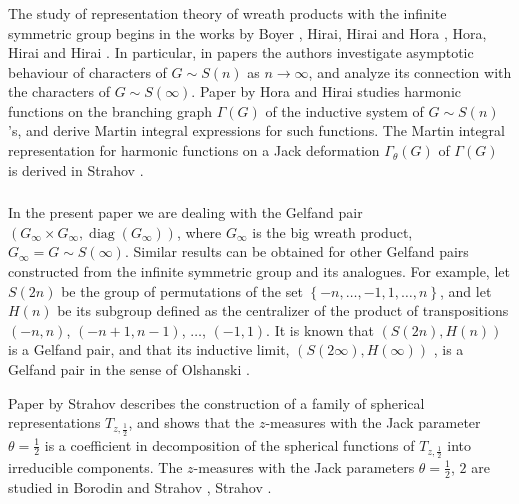 \documentclass[12pt]{amsart}
\theoremstyle{definition}
\numberwithin{equation}{section}
\DeclareMathOperator{\diag}{diag}
\begin{document}
\subsubsection{}
The study of representation theory of wreath products with the infinite symmetric group begins in the works by Boyer \cite{Boyer}, Hirai,  Hirai and Hora \cite{HiraiHiraiHoraI},  Hora, Hirai and Hirai \cite{HoraHiraiHiraiII}.
In particular, in papers \cite{HiraiHiraiHoraI,HoraHiraiHiraiII}
the authors investigate asymptotic behaviour of characters of $G\sim S(n)$ as $n\rightarrow\infty$, and analyze its connection with the characters of $G\sim S(\infty)$. Paper by Hora and Hirai \cite{HoraHirai} studies harmonic functions on the branching graph $\Gamma\left(G\right)$ of the inductive system of $G\sim S(n)$'s, and derive Martin integral expressions for such functions. The Martin integral representation for harmonic functions on a Jack deformation $\Gamma_{\theta}\left(G\right)$ of $\Gamma\left(G\right)$ is derived in Strahov \cite{StrahovMPS}.

\subsubsection{} In the present paper we are dealing with the Gelfand pair
$\left(G_{\infty}\times G_{\infty},\diag\left(G_{\infty}\right)\right)$,
where $G_{\infty}$ is the big wreath product, $G_{\infty}=G\sim S(\infty)$.
Similar results can be obtained for other Gelfand pairs
constructed from the infinite symmetric group and its analogues.
For example, let $S(2n)$ be  the group of permutations of the set $\left\{-n,\ldots,-1,1,\ldots,n\right\}$, and let $H(n)$ be its subgroup defined as the centralizer of the product of transpositions $(-n,n)$, $(-n+1,n-1)$,
 $\ldots$, $(-1,1)$. It is known that $\left(S(2n),H(n)\right)$ is a Gelfand pair,
and that its inductive limit, $\left(S(2\infty), H(\infty)\right)$ , is a Gelfand pair in the sense of Olshanski \cite{Olshanski}.


Paper by Strahov \cite{StrahovSH}
 describes the construction of a family of spherical representations
 $T_{z,\frac{1}{2}}$, and shows that the $z$-measures with the Jack parameter $\theta=\frac{1}{2}$ is a coefficient in decomposition of the spherical functions of $T_{z,\frac{1}{2}}$ into irreducible components. The $z$-measures with the Jack parameters $\theta=\frac{1}{2}$, $2$ are studied in Borodin and Strahov \cite{BorodinStrahov}, Strahov \cite{StrahovMatrixKernels, StrahovSH, StrahovPfaffian}.
\end{document}
